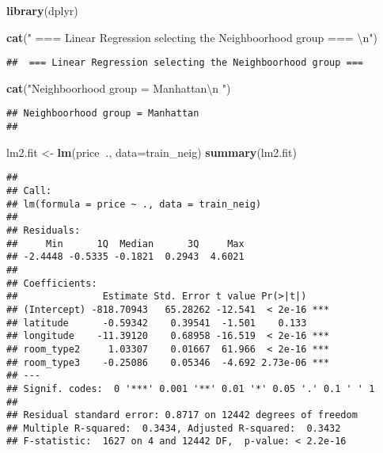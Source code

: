 \documentclass[
]{article}
\newenvironment{Shaded}{\begin{snugshade}}{\end{snugshade}}
\newcommand{\CharTok}[1]{\textcolor[rgb]{0.31,0.60,0.02}{#1}}
\newcommand{\DataTypeTok}[1]{\textcolor[rgb]{0.13,0.29,0.53}{#1}}
\newcommand{\KeywordTok}[1]{\textcolor[rgb]{0.13,0.29,0.53}{\textbf{#1}}}
\newcommand{\NormalTok}[1]{#1}
\newcommand{\OperatorTok}[1]{\textcolor[rgb]{0.81,0.36,0.00}{\textbf{#1}}}
\newcommand{\StringTok}[1]{\textcolor[rgb]{0.31,0.60,0.02}{#1}}
\begin{document}
\begin{Shaded}
\begin{Highlighting}[]
\KeywordTok{library}\NormalTok{(dplyr)}

\KeywordTok{cat}\NormalTok{(}\StringTok{" === Linear Regression selecting the Neighboorhood group === }\CharTok{\textbackslash{}n}\StringTok{"}\NormalTok{)}
\end{Highlighting}
\end{Shaded}

\begin{verbatim}
##  === Linear Regression selecting the Neighboorhood group ===
\end{verbatim}

\begin{Shaded}
\begin{Highlighting}[]
\KeywordTok{cat}\NormalTok{(}\StringTok{"Neighboorhood group = Manhattan}\CharTok{\textbackslash{}n}\StringTok{ "}\NormalTok{)}
\end{Highlighting}
\end{Shaded}

\begin{verbatim}
## Neighboorhood group = Manhattan
## 
\end{verbatim}

\begin{Shaded}
\begin{Highlighting}[]
\NormalTok{lm2.fit <-}\StringTok{ }\KeywordTok{lm}\NormalTok{(price}\OperatorTok{~}\NormalTok{., }\DataTypeTok{data=}\NormalTok{train_neig)}
\KeywordTok{summary}\NormalTok{(lm2.fit)}
\end{Highlighting}
\end{Shaded}

\begin{verbatim}
## 
## Call:
## lm(formula = price ~ ., data = train_neig)
## 
## Residuals:
##     Min      1Q  Median      3Q     Max 
## -2.4448 -0.5335 -0.1821  0.2943  4.6021 
## 
## Coefficients:
##               Estimate Std. Error t value Pr(>|t|)    
## (Intercept) -818.70943   65.28262 -12.541  < 2e-16 ***
## latitude      -0.59342    0.39541  -1.501    0.133    
## longitude    -11.39120    0.68958 -16.519  < 2e-16 ***
## room_type2     1.03307    0.01667  61.966  < 2e-16 ***
## room_type3    -0.25086    0.05346  -4.692 2.73e-06 ***
## ---
## Signif. codes:  0 '***' 0.001 '**' 0.01 '*' 0.05 '.' 0.1 ' ' 1
## 
## Residual standard error: 0.8717 on 12442 degrees of freedom
## Multiple R-squared:  0.3434, Adjusted R-squared:  0.3432 
## F-statistic:  1627 on 4 and 12442 DF,  p-value: < 2.2e-16
\end{verbatim}
\end{document}
